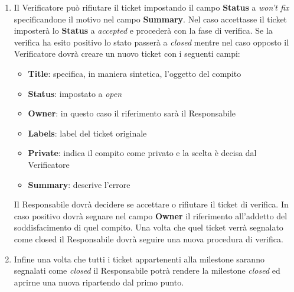 {{\begin{enumerate}
\begin{itemize}
\begin{center}
				\end{center}
				\item \textbf{Status}: come in precedenza è da impostare come \emph{open}
				\item \textbf{Owner}: questa volta sarà il riferimento del Verificatore proprietario di questo ticket
				\item \textbf{Labels}: si aggiunge al label del ticket originale il suffisso \textbf{V}
				\item \textbf{Private}: indica il compito come privato e la scelta è lasciata al Responsabile 
				\item \textbf{Summary}: descrizione fatta dal Responsabile
			\end{itemize}
			\item Il Verificatore può rifiutare il ticket impostando il campo \textbf{Status} a \emph{won't fix} specificandone il motivo nel campo \textbf{Summary}. Nel caso accettasse il ticket imposterà lo \textbf{Status} a \emph{accepted}  e procederà con la fase di verifica.
			Se la verifica ha esito positivo lo stato passerà a \emph{closed} mentre nel caso opposto il Verificatore dovrà creare un nuovo ticket con i seguenti campi:
			
			\begin{itemize}
				\item \textbf{Title}: specifica, in maniera sintetica, l’oggetto del compito
				\item \textbf{Status}: impostato a \emph{open}
				\item \textbf{Owner}: in questo caso il riferimento sarà il Responsabile 
				\item \textbf{Labels}: label del ticket originale
				\item \textbf{Private}: indica il compito come privato e la scelta è decisa dal Verificatore
				\item \textbf{Summary}: descrive l’errore
			\end{itemize}
			Il Responsabile dovrà decidere se accettare o rifiutare il ticket di verifica. In caso positivo dovrà segnare nel campo \textbf{Owner} il riferimento all’addetto del soddisfacimento di quel compito. Una volta che quel ticket verrà segnalato come closed il Responsabile dovrà seguire una nuova procedura di verifica.
			\item Infine una volta che tutti i ticket appartenenti alla milestone saranno segnalati come \emph{closed} il Responsabile potrà rendere la milestone \emph{closed} ed aprirne una nuova ripartendo dal primo punto.
		\end{enumerate}

		
	 }
}